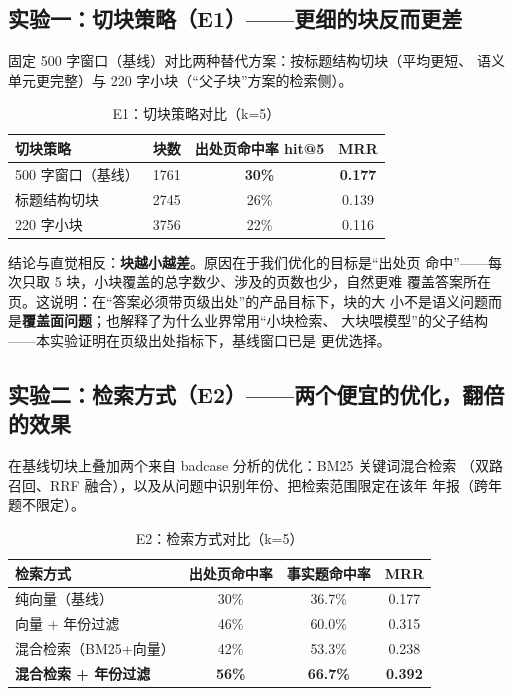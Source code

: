 \documentclass[UTF8,11pt]{ctexart}
\begin{document}
\subsection{实验一：切块策略（E1）——更细的块反而更差}

固定 500 字窗口（基线）对比两种替代方案：按标题结构切块（平均更短、
语义单元更完整）与 220 字小块（``父子块''方案的检索侧）。

\begin{table}[H]
\centering
\begin{tabular}{lccc}
\toprule
切块策略 & 块数 & 出处页命中率 hit@5 & MRR \\
\midrule
500 字窗口（基线） & 1761 & \textbf{30\%} & \textbf{0.177} \\
标题结构切块 & 2745 & 26\% & 0.139 \\
220 字小块 & 3756 & 22\% & 0.116 \\
\bottomrule
\end{tabular}
\caption{E1：切块策略对比（k=5）}
\label{tab:e1}
\end{table}

结论与直觉相反：\textbf{块越小越差}。原因在于我们优化的目标是``出处页
命中''——每次只取 5 块，小块覆盖的总字数少、涉及的页数也少，自然更难
覆盖答案所在页。这说明：在``答案必须带页级出处''的产品目标下，块的大
小不是语义问题而是\textbf{覆盖面问题}；也解释了为什么业界常用``小块检索、
大块喂模型''的父子结构——本实验证明在页级出处指标下，基线窗口已是
更优选择。

\subsection{实验二：检索方式（E2）——两个便宜的优化，翻倍的效果}

在基线切块上叠加两个来自 badcase 分析的优化：BM25 关键词混合检索
（双路召回、RRF 融合），以及从问题中识别年份、把检索范围限定在该年
年报（跨年题不限定）。

\begin{table}[H]
\centering
\begin{tabular}{lccc}
\toprule
检索方式 & 出处页命中率 & 事实题命中率 & MRR \\
\midrule
纯向量（基线） & 30\% & 36.7\% & 0.177 \\
向量 + 年份过滤 & 46\% & 60.0\% & 0.315 \\
混合检索（BM25+向量） & 42\% & 53.3\% & 0.238 \\
\textbf{混合检索 + 年份过滤} & \textbf{56\%} & \textbf{66.7\%} & \textbf{0.392} \\
\bottomrule
\end{tabular}
\caption{E2：检索方式对比（k=5）}
\label{tab:e2}
\end{table}
\end{document}
